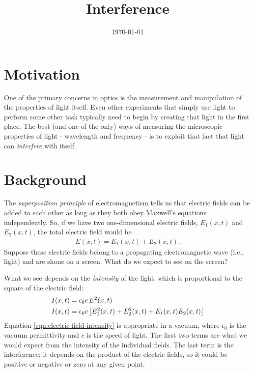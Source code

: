 \documentclass[]{manual}
\title{Interference}
\date{\today}
\begin{document}
    \maketitle
    \thispagestyle{firstpage}


    \section*{Motivation}
    
    One of the primary concerns in optics is the measurement and manipulation of the properties of light itself.
    Even other experiments that simply use light to perform some other task typically need to begin by creating that light in the first place.
    The best (and one of the only) ways of measuring the microscopic properties of light - wavelength and frequency - is to exploit that fact that light can \emph{interfere} with itself.


    \section*{Background}
    
    The \emph{superposition principle} of electromagnetism tells us that electric fields can be added to each other as long as they both obey Maxwell's equations independently.
    So, if we have two one-dimensional electric fields, $E_1(x, t)$ and $E_2(x, t)$, the total electric field would be
    \begin{align} \label{eqn:electric-field-superposition}
        E(x, t) = E_1(x, t) + E_2(x, t).
    \end{align}
    Suppose these electric fields belong to a propagating electromagnetic wave (i.e., light) and are shone on a screen.
    What do we expect to see on the screen?
    
    What we see depends on the \emph{intensity} of the light, which is proportional to the square of the electric field:
    \begin{align} \label{eqn:electric-field-intensity}
        I(x, t) &= \epsilon_0 c \, E^2(x, t) \nonumber \\
        I(x, t) &= \epsilon_0 c \,  \qty[ E_1^2(x, t) + E_2^2(x, t) + E_1(x, t) E_2(x, t) ]
    \end{align}
    Equation \eqref{eqn:electric-field-intensity} is appropriate in a vacuum, where $\epsilon_0$ is the vacuum permittivity and $c$ is the speed of light.
    The first two terms are what we would expect from the intensity of the individual fields.
    The last term is the interference: it depends on the product of the electric fields, so it could be positive or negative or zero at any given point.
    
\end{document}
